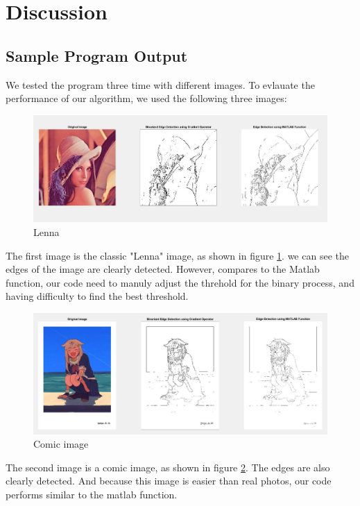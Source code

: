 \documentclass[a4paper,11pt]{article}
\begin{document}
\section{Discussion}

\subsection{Sample Program Output}
We tested the program three time with different images. To evlauate the performance of our algorithm, we used the following three images:

\begin{figure}[H]
    \centering
    \includegraphics[width=0.8\linewidth]{Demo1.jpg}
    \caption{Lenna}
    \label{pic:Demo_1}
\end{figure}
The first image is the classic "Lenna" image, as shown in figure \ref{pic:Demo_1}. we can see the edges of the image are clearly detected. However, compares to the Matlab function, our code need to manuly adjust the threhold for the binary process, and having difficulty to find the best threshold.

\begin{figure}[H]
    \centering
    \includegraphics[width=0.8\linewidth]{Demo2.jpg}
    \caption{Comic image}
    \label{pic:Demo_2}
\end{figure}
The second image is a comic image, as shown in figure \ref{pic:Demo_2}. The edges are also clearly detected. And because this image is easier than real photos, our code performs similar to the matlab function.
\end{document}
